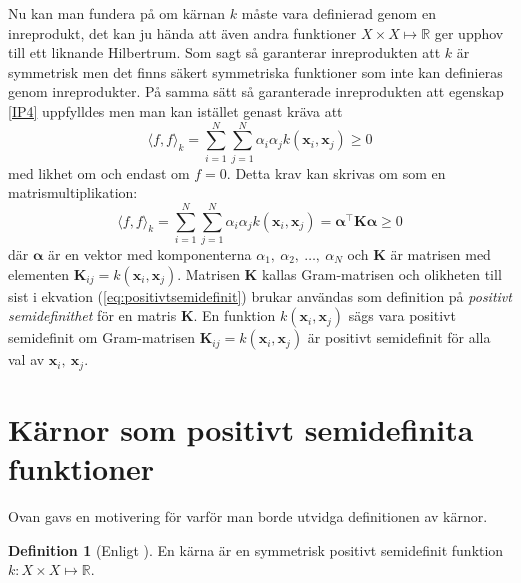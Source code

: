 \documentclass[a4paper, 12pt]{report}
\theoremstyle{definition}
\newtheorem{defi}{Definition}[section]
\theoremstyle{remark}
\newcommand{\bfx}{\mathbf{x}}
\begin{document}
Nu kan man fundera på om kärnan $k$ måste vara definierad genom en inreprodukt, det kan ju hända att även andra funktioner $X \times X \longmapsto \mathbb{R}$ ger upphov till ett liknande Hilbertrum. Som sagt så garanterar inreprodukten att $k$ är symmetrisk men det finns säkert symmetriska funktioner som inte kan definieras genom inreprodukter. På samma sätt så garanterade inreprodukten att egenskap \ref{IP4} uppfylldes men man kan istället genast kräva att
\begin{equation*}
	\langle f, f \rangle_k = \sum_{i=1}^{N}\sum_{j=1}^{N}\alpha_i\alpha_jk\left(\bfx_i, \bfx_j\right) \geq 0
\end{equation*}
med likhet om och endast om $f=0$. Detta krav kan skrivas om som en matrismultiplikation:
\begin{equation}\label{eq:positivtsemidefinit}
\langle f, f \rangle_k = \sum_{i=1}^{N}\sum_{j=1}^{N}\alpha_i\alpha_jk\left(\bfx_i, \bfx_j\right) = \boldsymbol{\alpha}^\intercal \mathbf{K} \boldsymbol{\alpha}\geq 0
\end{equation}
där $\boldsymbol{\alpha}$ är en vektor med komponenterna $\alpha_1,~\alpha_2,~\dots,~\alpha_N$ och $\mathbf{K}$ är matrisen med elementen $\mathbf{K}_{ij}=k\left(\bfx_i, \bfx_j\right)$. Matrisen $\mathbf{K}$ kallas Gram-matrisen och olikheten till sist i ekvation (\ref{eq:positivtsemidefinit}) brukar användas som definition på \emph{positivt semidefinithet} för en matris $\mathbf{K}$. En funktion $k\left(\bfx_i, \bfx_j\right)$ sägs vara positivt semidefinit om Gram-matrisen $\mathbf{K}_{ij}=k\left(\bfx_i, \bfx_j\right)$ är positivt semidefinit för alla val av $\bfx_i,~\bfx_j$.
\newpage
\section{Kärnor som positivt semidefinita funktioner}

Ovan gavs en motivering för varför man borde utvidga definitionen av kärnor.
\begin{defi}[Enligt \cite{LearningKernels}]
	En kärna är en symmetrisk positivt semidefinit funktion $k: X \times X \longmapsto \mathbb{R}$.
\end{defi}
\end{document}
